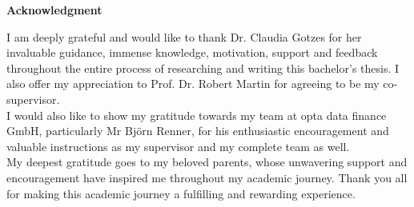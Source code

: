 \begin{center}
    \Large\textbf{Acknowledgment}
\end{center}\vspace{1cm}
\normalsize
I am deeply grateful and would like to thank Dr. Claudia Gotzes for her invaluable guidance, immense knowledge, motivation, support and feedback throughout the entire process of researching and writing this bachelor’s thesis. I also offer my appreciation to Prof. Dr. Robert Martin for agreeing to be my co-supervisor.\\
I would also like to show my gratitude towards my  team at opta data finance GmbH, particularly Mr Björn Renner, for his enthusiastic encouragement and valuable instructions as my supervisor and my complete team as well.\\
My deepest gratitude goes to my beloved parents, whose unwavering support and
encouragement have inspired me throughout my academic journey. Thank you all for making this academic journey a fulfilling and rewarding experience.
